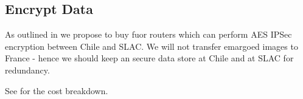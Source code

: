 \subsection{Encrypt Data} \label{sec:1encrypt}

As outlined in   we propose to buy fuor routers which can perform AES IPSec encryption between Chile and SLAC.
We will not transfer emargoed images to France - hence we should keep an secure data store at Chile and at SLAC for redundancy.

See  for the cost breakdown.




